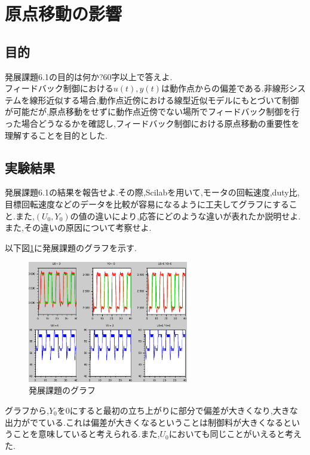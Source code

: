 \documentclass{jarticle}
\begin{document}
\section{原点移動の影響}
\subsection{目的}
発展課題6.1の目的は何か?60字以上で答えよ.\\

フィードバック制御における$u(t),y(t)$は動作点からの偏差である.非線形システムを線形近似する場合,動作点近傍における線型近似モデルにもとづいて制御が可能だが,原点移動をせずに動作点近傍でない場所でフィードバック制御を行った場合どうなるかを確認し,フィードバック制御における原点移動の重要性を理解することを目的とした.

\subsection{実験結果}
発展課題6.1の結果を報告せよ.その際,Scilabを用いて,モータの回転速度,duty比,目標回転速度などのデータを比較が容易になるように工夫してグラフにすること.また,$(U_0,Y_0)$の値の違いにより,応答にどのような違いが表れたか説明せよ.また,その違いの原因について考察せよ.

以下図\ref{fig:hatten6-1-1}に発展課題のグラフを示す.

\begin{figure}[H]
\begin{center}
\includegraphics[width=7.0cm]{images/hatten6-1-1.eps}
\caption{発展課題のグラフ}
\label{fig:hatten6-1-1}
\end{center}
\end{figure}

グラフから,$Y_0$を0にすると最初の立ち上がりに部分で偏差が大きくなり,大きな出力がでている.これは偏差が大きくなるということは制御料が大きくなるということを意味していると考えられる.また,$U_0$においても同じことがいえると考えた.
\end{document}
